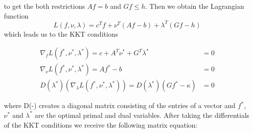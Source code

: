\documentclass{article}
\begin{document}
to get the both restrictions $Af=b$ and $Gf\leq h$. Then we obtain the Lagrangian function
\[L(f, \nu, \lambda) = c^T f + \nu ^T (Af-b) + \lambda^T(Gf-h)\]
which leads us to the KKT conditions

\begin{align*}
\nabla_f L(f^*,\nu^*, \lambda^*) = c + A^T \nu^*  + G^T\lambda^* &= 0 \\
\nabla _\nu L(f^*, \nu^*, \lambda^*) = Af^* - b &= 0 \\
D(\lambda^*) (\nabla_\lambda L(f^*, \nu^*, \lambda^*)) = D(\lambda^*)(Gf^*-\kappa) &= 0
\end{align*}

where D(-) creates a diagonal matrix consisting of the entries of a vector and $f^*$, $\nu^*$ and $\lambda^*$ are the optimal primal and dual variables. After taking the differentials of the KKT conditions we receive the following matrix equation:

\end{document}
